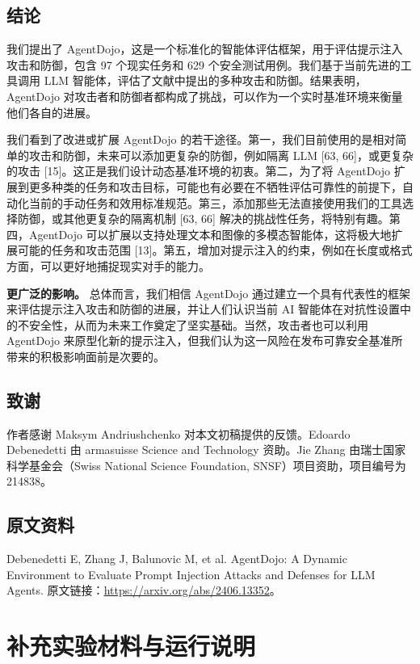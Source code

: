 \section{结论}

我们提出了 AgentDojo，这是一个标准化的智能体评估框架，用于评估提示注入攻击和防御，包含 97 个现实任务和 629 个安全测试用例。我们基于当前先进的工具调用 LLM 智能体，评估了文献中提出的多种攻击和防御。结果表明，AgentDojo 对攻击者和防御者都构成了挑战，可以作为一个实时基准环境来衡量他们各自的进展。

我们看到了改进或扩展 AgentDojo 的若干途径。第一，我们目前使用的是相对简单的攻击和防御，未来可以添加更复杂的防御，例如隔离 LLM [63, 66]，或更复杂的攻击 [15]。这正是我们设计动态基准环境的初衷。第二，为了将 AgentDojo 扩展到更多种类的任务和攻击目标，可能也有必要在不牺牲评估可靠性的前提下，自动化当前的手动任务和效用标准规范。第三，添加那些无法直接使用我们的工具选择防御，或其他更复杂的隔离机制 [63, 66] 解决的挑战性任务，将特别有趣。第四，AgentDojo 可以扩展以支持处理文本和图像的多模态智能体，这将极大地扩展可能的任务和攻击范围 [13]。第五，增加对提示注入的约束，例如在长度或格式方面，可以更好地捕捉现实对手的能力。

\textbf{更广泛的影响。} 总体而言，我们相信 AgentDojo 通过建立一个具有代表性的框架来评估提示注入攻击和防御的进展，并让人们认识当前 AI 智能体在对抗性设置中的不安全性，从而为未来工作奠定了坚实基础。当然，攻击者也可以利用 AgentDojo 来原型化新的提示注入，但我们认为这一风险在发布可靠安全基准所带来的积极影响面前是次要的。

\section*{致谢}

作者感谢 Maksym Andriushchenko 对本文初稿提供的反馈。Edoardo Debenedetti 由 armasuisse Science and Technology 资助。Jie Zhang 由瑞士国家科学基金会（Swiss National Science Foundation, SNSF）项目资助，项目编号为 214838。

\section*{原文资料}

Debenedetti E, Zhang J, Balunovic M, et al. AgentDojo: A Dynamic Environment to Evaluate Prompt Injection Attacks and Defenses for LLM Agents. 原文链接：\url{https://arxiv.org/abs/2406.13352}。

\chapter{补充实验材料与运行说明}

